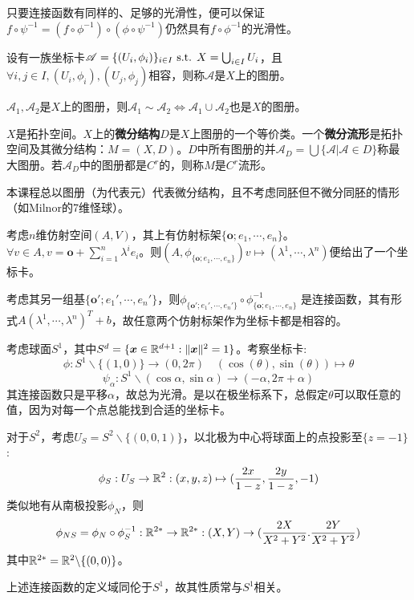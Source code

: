 \documentclass{ctexbook}
\begin{document}
只要连接函数有同样的、足够的光滑性，便可以保证$f\circ \psi^{-1}=(f\circ \phi^{-1})\circ (\phi\circ \psi^{-1})$仍然具有$f\circ \phi^{-1}$的光滑性。



\begin{Def}[图册(Atlas)]
  设有一族坐标卡$\mathscr{A}=\{(U_{i},\phi_{i})\}_{i\in I}\text{ s.t. } X=\bigcup_{i\in I}U_{i}$，且$\forall i,j\in I,(U_{i},\phi_{i}),(U_{j},\phi_{j})$相容，则称$\mathscr{A}$是$X$上的图册。

$\mathscr{A}_{1},\mathscr{A}_{2}$是$X$上的图册，则$\mathscr{A}_{1}\sim \mathscr{A}_{2}\Leftrightarrow \mathscr{A}_{1}\cup\mathscr{A}_{2}$也是$X$的图册。
\end{Def}

\begin{Def}[微分流形]
  $X$是拓扑空间。$X$上的\textbf{微分结构}$D$是$X$上图册的一个等价类。一个\textbf{微分流形}是拓扑空间及其微分结构：$M=(X,D)$。$D$中所有图册的并$\mathscr{A}_{D}=\bigcup\{\mathscr{A}|\mathscr{A}\in D\}$称最大图册。若$\mathscr{A}_{D}$中的图册都是$C^{r}$的，则称$M$是$C^{r}$流形。
\end{Def}

本课程总以图册（为代表元）代表微分结构，且不考虑同胚但不微分同胚的情形（如Milnor的7维怪球）。

\begin{Eg}
  考虑$n$维仿射空间$(A,V)$，其上有仿射标架$\{\bm o;e_{1},\cdots,e_{n}\}$。$\forall v\in A,v=\bm o+\sum_{i=1}^{n}\lambda^{i}e_{i}$。则$(A,\phi_{\{\bm o;e_{1},\cdots,e_{n}\}})v\mapsto (\lambda^{1},\cdots,\lambda^{n})$便给出了一个坐标卡。


  考虑其另一组基$\{\bm o';e_{1}',\cdots,e_{n}'\}$，则$\phi_{\{\bm o';e_{1}',\cdots,e_{n}'\}}\circ \phi^{-1}_{\{\bm o;e_{1},\cdots,e_{n}\}}$ 是连接函数，其有形式$A(\lambda^{1},\cdots,\lambda^{n})^{T}+b $，故任意两个仿射标架作为坐标卡都是相容的。
\end{Eg}

\begin{Eg}
  考虑球面$S^{1}$，其中$S^{d}=\{\bm x\in\mathbb{R}^{d+1}:\|\bm x\|^{2}=1\}$。考察坐标卡:
  \[\phi:S^{1}\backslash \{(1,0)\}\to (0,2\pi)\quad (\cos(\theta),\sin(\theta))\mapsto \theta\]
  \[\psi_{\alpha}:S^{1}\backslash (\cos\alpha,\sin\alpha)\to(-\alpha,2\pi+\alpha)\]
其连接函数只是平移$\alpha$，故总为光滑。是以在极坐标系下，总假定$\theta$可以取任意的值，因为对每一个点总能找到合适的坐标卡。
\end{Eg}

\begin{Eg}
  对于$S^{2}$，考虑$U_{S}=S^{2}\backslash \{(0,0,1)\}$，以北极为中心将球面上的点投影至$\{z=-1\}$:
  \[\phi_{S}:U_{S}\to \mathbb{R}^{2}:(x,y,z)\mapsto (\frac{2x}{1-z},\frac{2y}{1-z},-1)\]
  类似地有从南极投影$\phi_{N}$，则
  \[\phi_{NS}=\phi_{N}\circ \phi_{S}^{-1}:\mathbb{R}^{2*}\to\mathbb{R}^{2*}:(X,Y)\to (\frac{2X}{X^{2}+Y^{2}}.\frac{2Y}{X^{2}+Y^{2}})\]
  其中$\mathbb{R}^{2*}=\mathbb{R}^{2}\backslash \{(0,0)\}$。

  上述连接函数的定义域同伦于$S^{1}$，故其性质常与$S^{1}$相关。
\end{Eg}
\end{document}
